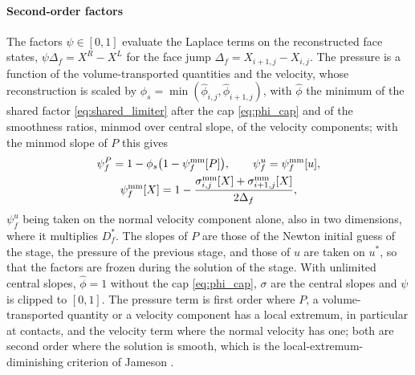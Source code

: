 \paragraph{Second-order factors}
The factors $\psi\in[0,1]$ evaluate the Laplace terms on the reconstructed face states, $\psi\Delta_f=X^R-X^L$ for the face jump
$\Delta_f=X_{i+1,j}-X_{i,j}$. The pressure is a function of the volume-transported quantities and the velocity, whose reconstruction is scaled by
$\phi_s=\min(\hat\phi_{i,j},\hat\phi_{i+1,j})$, with $\hat\phi$ the minimum of the shared factor \eqref{eq:shared_limiter} after the cap \eqref{eq:phi_cap} and of the smoothness ratios,
minmod over central slope, of the velocity components; with the minmod slope of $P$ this gives
\begin{equation}
\begin{gathered}
\psi^P_f=1-\phi_s\big(1-\psi^{\rm mm}_f[P]\big),\qquad \psi^u_f=\psi^{\rm mm}_f[u],\\
\psi^{\rm mm}_f[X]=1-\frac{\sigma^{\rm mm}_{i,j}[X]+\sigma^{\rm mm}_{i+1,j}[X]}{2\Delta_f},
\end{gathered}
\label{eq:psi}
\end{equation}
$\psi^u_f$ being taken on the normal velocity component alone, also in two dimensions, where it multiplies $D^*_f$. The slopes of $P$ are those of the Newton initial guess of the stage, the pressure
of the previous stage, and those of $u$ are taken on $u^*$, so that the factors are frozen during the solution of the stage.
With unlimited central slopes, $\hat\phi=1$ without the cap \eqref{eq:phi_cap}, $\sigma$ are the central slopes and $\psi$ is clipped to $[0,1]$. The
pressure term is first order where $P$, a volume-transported quantity or a velocity component has a local extremum, in
particular at contacts, and the velocity term where the normal velocity has one; both are second order where the
solution is smooth, which is the local-extremum-diminishing criterion of Jameson \cite{Jameson1995}.

